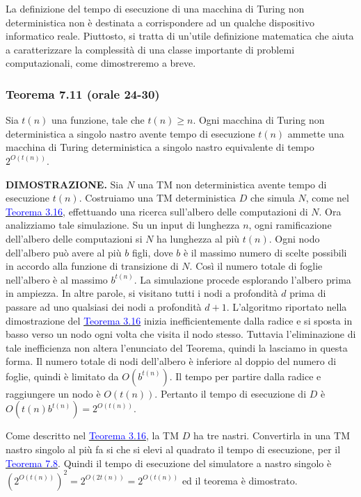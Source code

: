 \documentclass{article}
\begin{document}
La definizione del tempo di esecuzione di una macchina di Turing non deterministica non è destinata a corrispondere ad un qualche dispositivo informatico reale.
Piuttosto, si tratta di un'utile definizione matematica che aiuta a caratterizzare la complessità di una classe importante di problemi computazionali, come dimostreremo a breve.

\subsubsection{Teorema 7.11 (orale 24-30)}
\label{teorema-7.11}
\begin{tcolorbox}[colback=yellow!10!white, colframe=yellow!50!black, title=Teorema 7.11]
    Sia $t(n)$ una funzione, tale che $t(n) \geq n$.
    Ogni macchina di Turing non deterministica a singolo nastro avente tempo di esecuzione $t(n)$ ammette una macchina di Turing deterministica a singolo nastro equivalente di tempo $2^{O(t(n))}$.
\end{tcolorbox}

\hbox{\textbf{DIMOSTRAZIONE.}}
Sia $N$ una TM non deterministica avente tempo di esecuzione $t(n)$.
Costruiamo una TM deterministica $D$ che simula $N$, come nel \hyperref[teorema-3.16]{\textcolor{blue}{Teorema 3.16}}, effettuando una ricerca sull'albero delle computazioni di $N$.
Ora analizziamo tale simulazione.
Su un input di lunghezza $n$, ogni ramificazione dell'albero delle computazioni si $N$ ha lunghezza al più $t(n)$.
Ogni nodo dell'albero può avere al più $b$ figli, dove $b$ è il massimo numero di scelte possibili in accordo alla funzione di transizione di $N$.
Così il numero totale di foglie nell'albero è al massimo $b^{t(n)}$.
La simulazione procede esplorando l'albero prima in ampiezza.
In altre parole, si visitano tutti i nodi a profondità $d$ prima di passare ad uno qualsiasi dei nodi a profondità $d + 1$.
L'algoritmo riportato nella dimostrazione del \hyperref[teorema-3.16]{\textcolor{blue}{Teorema 3.16}} inizia inefficientemente dalla radice e si sposta in basso verso un nodo ogni volta che visita il nodo stesso.
Tuttavia l'eliminazione di tale inefficienza non altera l'enunciato del Teorema, quindi la lasciamo in questa forma.
Il numero totale di nodi dell'albero è inferiore al doppio del numero di foglie, quindi è limitato da $O(b^{t(n)})$.
Il tempo per partire dalla radice e raggiungere un nodo è $O(t(n))$.
Pertanto il tempo di esecuzione di $D$ è $O(t(n)b^{t(n)}) = 2^{O(t(n))}$.

Come descritto nel \hyperref[teorema-3.16]{\textcolor{blue}{Teorema 3.16}}, la TM $D$ ha tre nastri.
Convertirla in una TM nastro singolo al più fa si che si elevi al quadrato il tempo di esecuzione, per il \hyperref[teorema-7.8]{\textcolor{blue}{Teorema 7.8}}.
Quindi il tempo di esecuzione del simulatore a nastro singolo è $(2^{O(t(n))})^2 = 2^{O(2t(n))} = 2^{O(t(n))}$ ed il teorema è dimostrato.
\end{document}
